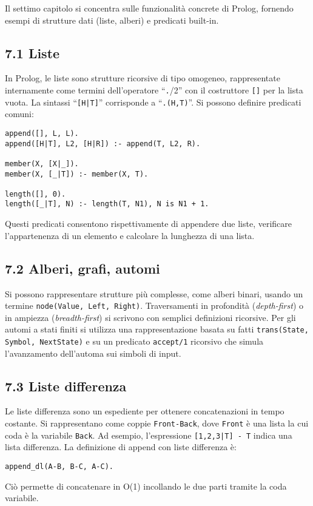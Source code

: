 \documentclass[12pt]{article}
\begin{document}
Il settimo capitolo si concentra sulle funzionalità concrete di Prolog, fornendo esempi di strutture dati (liste, alberi) e predicati built-in.

\subsection*{7.1 Liste}

In Prolog, le liste sono strutture ricorsive di tipo omogeneo, rappresentate internamente come termini dell'operatore ``\texttt{.}/2'' con il costruttore \texttt{[]} per la lista vuota. La sintassi ``\texttt{[H|T]}'' corrisponde a ``\texttt{.(H,T)}''. Si possono definire predicati comuni:
\begin{verbatim}
append([], L, L).
append([H|T], L2, [H|R]) :- append(T, L2, R).

member(X, [X|_]).
member(X, [_|T]) :- member(X, T).

length([], 0).
length([_|T], N) :- length(T, N1), N is N1 + 1.
\end{verbatim}
Questi predicati consentono rispettivamente di appendere due liste, verificare l'appartenenza di un elemento e calcolare la lunghezza di una lista.

\subsection*{7.2 Alberi, grafi, automi}

Si possono rappresentare strutture più complesse, come alberi binari, usando un termine \texttt{node(Value, Left, Right)}. Traversamenti in profondità (\emph{depth-first}) o in ampiezza (\emph{breadth-first}) si scrivono con semplici definizioni ricorsive. Per gli automi a stati finiti si utilizza una rappresentazione basata su fatti \texttt{trans(State, Symbol, NextState)} e su un predicato \texttt{accept/1} ricorsivo che simula l'avanzamento dell'automa sui simboli di input.

\subsection*{7.3 Liste differenza}

Le liste differenza sono un espediente per ottenere concatenazioni in tempo costante. Si rappresentano come coppie \texttt{Front-Back}, dove \texttt{Front} è una lista la cui coda è la variabile \texttt{Back}. Ad esempio, l'espressione \texttt{[1,2,3|T] - T} indica una lista differenza. La definizione di append con liste differenza è:
\begin{verbatim}
append_dl(A-B, B-C, A-C).
\end{verbatim}
Ciò permette di concatenare in O(1) incollando le due parti tramite la coda variabile.
\end{document}
